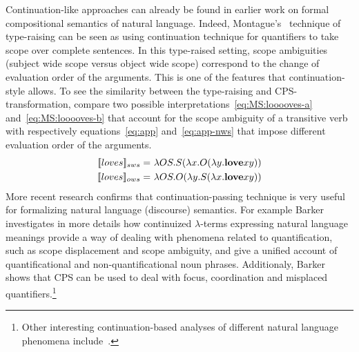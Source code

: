 Continuation-like approaches can already be found in earlier work on formal compositional semantics of natural language. Indeed, Montague's~\cite{Montague:1973:The-Proper-Treatment-of-Quantification-in-Ordinary-English} technique of type-raising can be seen as using continuation technique for quantifiers to take scope over complete sentences. In this type-raised setting, scope ambiguities (subject wide scope versus object wide scope) correspond to the change of evaluation order of the arguments. This is one of the features that continuation-style allows. To see the similarity between the type-raising and CPS-transformation, compare two possible interpretations~\eqref{eq:MS:looooves-a} and~\eqref{eq:MS:looooves-b} that account for the scope ambiguity of a transitive verb with respectively equations~\eqref{eq:app} and~\eqref{eq:app-nws} that impose different evaluation order of the arguments.
%
\begin{subequations}
\begin{align}
\I{loves}_{sws} = \ & \lambda OS. S (\lambda x. O (\lambda y. \textbf{love} x y) ) \label{eq:MS:looooves-a} \\
\I{loves}_{ows} = \ & \lambda OS. O (\lambda y. S (\lambda x. \textbf{love} x y) ) \label{eq:MS:looooves-b}
\end{align}
\label{eq:MS:looooves}
\end{subequations}
%
More recent research confirms that continuation-passing technique is very useful for formalizing natural language (discourse) semantics. For example Barker~\cite{Barker:2002:Continuations-and-the-Nature-of-Quantification} investigates in more details how continuized $\lambda$-terms expressing natural language meanings provide a way of dealing with phenomena related to quantification, such as scope displacement and scope ambiguity, and give a unified account of quantificational and non-quantificational noun phrases. Additionaly, Barker~\cite{Barker:2004:Continuations-in-Natural-Language} shows that CPS can be used to deal with focus, coordination and misplaced quantifiers.\footnote{Other interesting continuation-based analyses of different natural language phenomena include~\cite{Shan:2002:A-continuation-semantics-of-interrogatives-that-accounts-for-Bakers-ambiguity,Shan:2004:Delimited-continuations-in-natural-language,BarkerShan:2008:Donkey-Anaphora-is-In-Scope-Binding}.}


